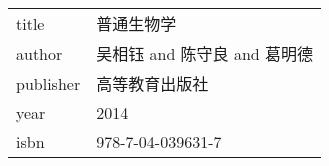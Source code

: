 

\begin{table}[H]
    \begin{tabular}{@{·}l@{ : }l}
        title     & 普通生物学                    \\
        author    & 吴相钰 and 陈守良 and 葛明德   \\
        publisher & 高等教育出版社                 \\
        year      & 2014                          \\
        isbn      & 978-7-04-039631-7
    \end{tabular}
\end{table}

